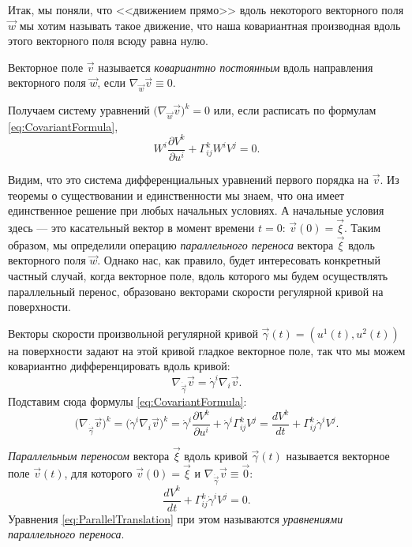 Итак, мы поняли, что <<движением прямо>> вдоль некоторого векторного поля $\vec{w}$ мы хотим называть такое движение, что наша ковариантная производная вдоль этого векторного поля всюду равна нулю.

\begin{definition}
	Векторное поле $\vec{v}$ называется \textit{ковариантно постоянным} вдоль направления векторного поля $\vec{w}$, если $\nabla_{\vec{w}}\vec{v} \equiv 0$.
\end{definition}

Получаем систему уравнений $\big(\nabla_{\vec{w}}\vec{v}\big)^k = 0$ или, если расписать по формулам \eqref{eq:CovariantFormula},
\[
	W^i\frac{\partial V^k}{\partial u^i} + \Gamma_{ij}^kW^iV^j = 0.
\]

Видим, что это система дифференциальных уравнений первого порядка на $\vec{v}$. Из теоремы о существовании и единственности мы знаем, что она имеет единственное решение при любых начальных условиях. А начальные условия здесь --- это касательный вектор в момент времени $t = 0$: $\vec{v}(0) = \vec{\xi}$. Таким образом, мы определили операцию \textit{параллельного переноса} вектора $\vec{\xi}$ вдоль векторного поля $\vec{w}$. Однако нас, как правило, будет интересовать конкретный частный случай, когда векторное поле, вдоль которого мы будем осуществлять параллельный перенос, образовано векторами скорости регулярной кривой на поверхности.

Векторы скорости произвольной регулярной кривой $\vec{\gamma}(t) = (u^1(t), u^2(t))$ на поверхности задают на этой кривой гладкое векторное поле, так что мы можем ковариантно дифференцировать вдоль кривой:
\[
	\nabla_{\dot{\vec{\gamma}}}\vec{v} = \dot{\gamma}^i\nabla_i\vec{v}.
\]
Подставим сюда формулы \eqref{eq:CovariantFormula}:
\[
	\big(\nabla_{\dot{\vec{\gamma}}}\vec{v}\big)^k = \big(\dot{\gamma}^i\nabla_i\vec{v}\big)^k = \dot{\gamma}^i\frac{\partial V^k}{\partial u^i} + \dot{\gamma}^i\Gamma_{ij}^kV^j = \frac{dV^k}{dt} + \Gamma_{ij}^k\dot{\gamma}^iV^j.
\]

\begin{definition}
	\textit{Параллельным переносом} вектора $\vec{\xi}$ вдоль кривой $\vec{\gamma}(t)$ называется векторное поле $\vec{v}(t)$, для которого $\vec{v}(0) = \vec{\xi}$ и $\nabla_{\dot{\vec{\gamma}}}\vec{v} \equiv \vec{0}$:
	\begin{equation} \label{eq:ParallelTranslation}
		\frac{dV^k}{dt} + \Gamma_{ij}^k\dot{\gamma}^iV^j = 0.
	\end{equation}
	Уравнения \eqref{eq:ParallelTranslation} при этом называются \textit{уравнениями параллельного переноса}.
\end{definition}

